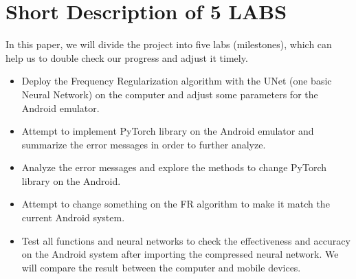 \documentclass{article}
\begin{document}
\section*{Short Description of 5 LABS}

In this paper, we will divide the project into five labs (milestones), which can help us to double check our progress and adjust it timely.

\begin{itemize}
	\item Deploy the Frequency Regularization algorithm with the UNet (one basic Neural Network) on the computer and adjust some parameters for the Android emulator. 
	
	\item Attempt to implement PyTorch library on the Android emulator and summarize the error messages in order to further analyze.
	
	\item Analyze the error messages and explore the methods to change PyTorch library on the Android.
	
	\item Attempt to change something on the FR algorithm to make it match the current Android system. 
	
	\item Test all functions and neural networks to check the effectiveness and accuracy on the Android system after importing the compressed neural network. We will compare the result between the computer and mobile devices. 
	
\end{itemize}



\small

% 
  
\end{document}
